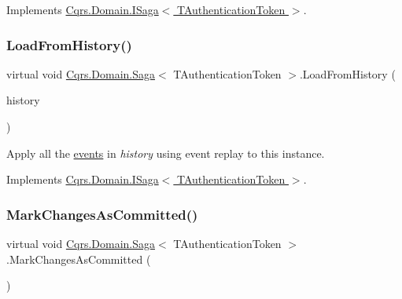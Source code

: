 Implements \hyperlink{interfaceCqrs_1_1Domain_1_1ISaga_abb77811b4f7d19adb61f9d33da18e7e0_abb77811b4f7d19adb61f9d33da18e7e0}{Cqrs.\+Domain.\+I\+Saga$<$ T\+Authentication\+Token $>$}.

\mbox{\label{classCqrs_1_1Domain_1_1Saga_a6029fc09445e2093f7fb40e304a04ff8_a6029fc09445e2093f7fb40e304a04ff8}} 
\subsubsection{\texorpdfstring{Load\+From\+History()}{LoadFromHistory()}}
{\footnotesize\ttfamily virtual void \hyperlink{classCqrs_1_1Domain_1_1Saga}{Cqrs.\+Domain.\+Saga}$<$ T\+Authentication\+Token $>$.Load\+From\+History (\begin{DoxyParamCaption}\item[{I\+Enumerable$<$ \hyperlink{interfaceCqrs_1_1Events_1_1ISagaEvent}{I\+Saga\+Event}$<$ T\+Authentication\+Token $>$$>$}]{history }\end{DoxyParamCaption})\hspace{0.3cm}{\ttfamily [virtual]}}



Apply all the \hyperlink{}{events} in {\itshape history}  using event replay to this instance. 



Implements \hyperlink{interfaceCqrs_1_1Domain_1_1ISaga_a2714804684bc65cf4dec79b4697b9b21_a2714804684bc65cf4dec79b4697b9b21}{Cqrs.\+Domain.\+I\+Saga$<$ T\+Authentication\+Token $>$}.

\mbox{\label{classCqrs_1_1Domain_1_1Saga_a9caac842ea6e88d6e502b63ca1820fe4_a9caac842ea6e88d6e502b63ca1820fe4}} 
\subsubsection{\texorpdfstring{Mark\+Changes\+As\+Committed()}{MarkChangesAsCommitted()}}
{\footnotesize\ttfamily virtual void \hyperlink{classCqrs_1_1Domain_1_1Saga}{Cqrs.\+Domain.\+Saga}$<$ T\+Authentication\+Token $>$.Mark\+Changes\+As\+Committed (\begin{DoxyParamCaption}{ }\end{DoxyParamCaption})\hspace{0.3cm}{\ttfamily [virtual]}}



